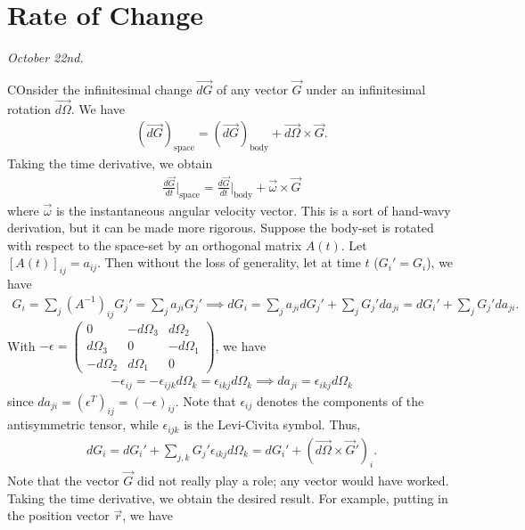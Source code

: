 \section{Rate of Change}
\textit{October 22nd.}

COnsider the infinitesimal change $\vec{dG}$ of any vector $\vec{G}$ under an infinitesimal rotation $\vec{d\Omega}$. We have
\begin{align}
    (\vec{dG})_{\text{space}} = (\vec{dG})_{\text{body}} + \vec{d\Omega} \times \vec{G}.
\end{align}
Taking the time derivative, we obtain
\begin{align}
    \frac{d\vec{G}}{dt}\Big|_{\text{space}} = \frac{d\vec{G}}{dt}\Big|_{\text{body}} + \vec{\omega} \times \vec{G}
\end{align}
where $\vec{\omega}$ is the instantaneous angular velocity vector. This is a sort of hand-wavy derivation, but it can be made more rigorous. Suppose the body-set is rotated with respect to the space-set by an orthogonal matrix $A(t)$. Let $[A(t)]_{ij} = a_{ij}$. Then without the loss of generality, let at time $t$ ($G_{i}'=G_{i}$), we have
\begin{align}
    G_{i} = \sum_{j} (A^{-1})_{ij} G_{j}' = \sum_{j} a_{ji} G_{j}' \implies dG_{i} = \sum_{j} a_{ji} dG_{j}' + \sum_{j} G_{j}' da_{ji} = dG_{i}' + \sum_{j} G_{j}' da_{ji}.
\end{align}
With $-\epsilon = \begin{pmatrix}
    0 & -d\Omega_{3} & d\Omega_{2} \\
    d\Omega_{3} & 0 & -d\Omega_{1} \\
    -d\Omega_{2} & d\Omega_{1} & 0
\end{pmatrix}$, we have
\begin{align}
    -\epsilon_{ij} = -\epsilon_{ijk} d\Omega_{k} = \epsilon_{ikj} d\Omega_{k} \implies da_{ji} = \epsilon_{ikj} d\Omega_{k}
\end{align}
since $da_{ji} = (\epsilon^{T})_{ij} = (-\epsilon)_{ij}$. Note that $\epsilon_{ij}$ denotes the components of the antisymmetric tensor, while $\epsilon_{ijk}$ is the Levi-Civita symbol. Thus,
\begin{align}
    dG_{i} = dG_{i}' + \sum_{j,k} G_{j}' \epsilon_{ikj} d\Omega_{k} = dG_{i}' + (\vec{d\Omega} \times \vec{G}')_{i}.
\end{align}
Note that the vector $\vec{G}$ did not really play a role; any vector would have worked. Taking the time derivative, we obtain the desired result. For example, putting in the position vector $\vec{r}$, we have

